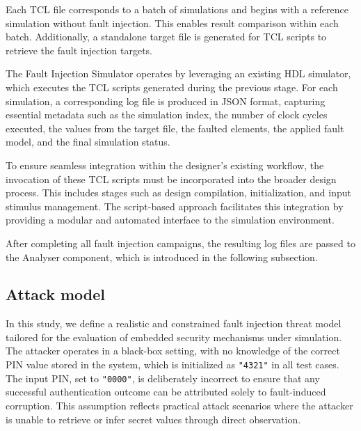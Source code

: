 Each TCL file corresponds to a batch of simulations and begins with a reference simulation without fault injection. This enables result comparison within each batch. Additionally, a standalone target file is generated for TCL scripts to retrieve the fault injection targets.

The Fault Injection Simulator operates by leveraging an existing HDL simulator, which executes the TCL scripts generated during the previous stage. For each simulation, a corresponding log file is produced in JSON format, capturing essential metadata such as the simulation index, the number of clock cycles executed, the values from the target file, the faulted elements, the applied fault model, and the final simulation status.

To ensure seamless integration within the designer’s existing workflow, the invocation of these TCL scripts must be incorporated into the broader design process. This includes stages such as design compilation, initialization, and input stimulus management. The script-based approach facilitates this integration by providing a modular and automated interface to the simulation environment.

After completing all fault injection campaigns, the resulting log files are passed to the Analyser component, which is introduced in the following subsection.

\subsection{Attack model}

In this study, we define a realistic and constrained fault injection threat model tailored for the evaluation of embedded security mechanisms under simulation. The attacker operates in a black-box setting, with no knowledge of the correct PIN value stored in the system, which is initialized as \texttt{"4321"} in all test cases. The input PIN, set to \texttt{"0000"}, is deliberately incorrect to ensure that any successful authentication outcome can be attributed solely to fault-induced corruption. This assumption reflects practical attack scenarios where the attacker is unable to retrieve or infer secret values through direct observation.

